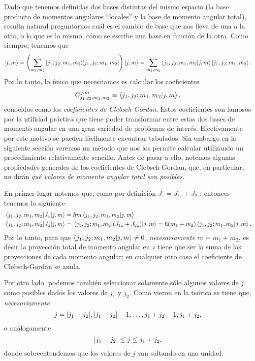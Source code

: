 \documentclass[10pt, a4paper]{article}
\numberwithin{equation}{subsection}
\begin{document}
\bigbreak

Dado que tenemos definidas dos bases distintas del mismo espacio (la base
producto de momentos angulares ``locales'' y la base de momento angular total),
resulta natural preguntarnos cuál es el cambio de base que nos lleva de una a
la otra, o lo que es lo mismo, cómo se escribe una base en función de la otra.
Como siempre, tenemos que
\begin{equation}
  \ket{j,m} = \left(\sum_{m_1,m_2}\projector{j_1,j_2;m_1,m_2}\right)\ket{j,m}
    = \sum_{m_1,m_2} \braket{j_1,j_2;m_1,m_2}{j,m} \ket{j_1,j_2;m_1,m_2}.
\end{equation}
Por lo tanto, lo único que necesitamos es calcular los coeficientes
\begin{equation}
  C_{j_1,j_2;m_1,m_2}^{j,m} \equiv \braket{{j_1},{j_2};{m_1},{m_2}}{{j},{m}},
\end{equation}
conocidos como los \emph{coeficientes de Clebsch-Gordan}. Estos coeficientes
son famosos por la utilidad práctica que tiene poder transformar entre estas
dos bases de momento angular en una gran variedad de problemas de interés.
Efectivamente por este motivo se pueden fácilmente encontrar tabulados. Sin
embargo en la siguiente sección veremos un método que nos los permite calcular
utilizando un procedimiento relativamente sencillo. Antes de pasar a ello,
notemos algunas propiedades generales de los coeficientes de Clebsch-Gordan,
que, en particular, no dirán \emph{qué valores de momento angular total son
posibles}.

\bigbreak

En primer lugar notemos que, como por definición $J_z = J_{1z} + J_{2z}$,
entonces tenemos lo siguiente
\begin{align}
  \matrixel{j_1,j_2;m_1,m_2}{J_z}{j,m} &= \hbar
    m\ClebschGordan{j_1}{j_2}{m_1}{m_2}{j}{m}
  \\
  \matrixel{j_1,j_2;m_1,m_2}{J_z}{j,m} &= 
  \matrixel{j_1,j_2;m_1,m_2}{\left(J_{1z} + J_{2z}\right)}{j,m} =
  \hbar(m_1+m_2) \ClebschGordan{j_1}{j_2}{m_1}{m_2}{j}{m}.
\end{align}
Por lo tanto, para que $\braket{{j_1},{j_2};{m_1},{m_2}}{{j},{m}} \neq 0$,
\emph{necesariamente} $m = m_1 + m_2$, es decir la proyección total de momento
angular en $z$ tiene que ser la suma de las proyecciones de cada momento
angular; en cualquier otro caso el coeficiente de Clebsch-Gordan se anula.

Por otro lado, podemos también seleccionar solamente sólo algunos valores de
$j$ como posibles dados los valores de $j_1$ y $j_2$. Como vieron en la teórica
se tiene que, \emph{necesariamente}
\begin{equation}
  j = \abs{j_1 - j_2}, \abs{j_1 - j_2} - 1, \ldots, j_1 + j_2 - 1, j_1 + j_2,
\end{equation}
o análogamente
\begin{equation}
  \abs{j_1 - j_2} \leq j \leq j_1 + j_2,
\end{equation}
donde sobreentendemos que los valores de $j$ van saltando en una unidad.
\end{document}
